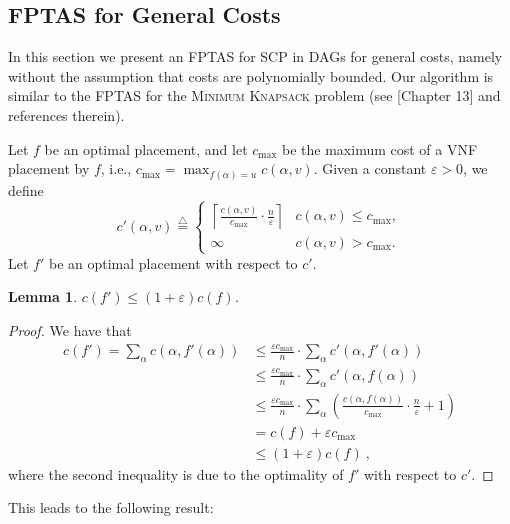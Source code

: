 \documentclass[11pt]{article}
\newtheorem{lemma}{Lemma}
\newcommand{\eqdf}{\stackrel{\scriptscriptstyle \triangle}{=}}
\newcommand{\paren}[1]{\left( #1 \right)}
\newcommand{\ceil}[1]{\left\lceil {#1} \right\rceil}
\newcommand{\eps}{\varepsilon}
\newcommand{\scp}{\textsc{SCP}\xspace}
\begin{document}

\subsection{FPTAS for General Costs}
\label{sub:fptas}

In this section we present an FPTAS for \scp in DAGs for general
costs, namely without the assumption that costs are polynomially
bounded.  Our algorithm is similar to the FPTAS for the
\textsc{Minimum Knapsack} problem (see \cite{KPP04}[Chapter 13] and
references therein).

Let $f$ be an optimal placement, and let $c_{\max}$ be the maximum
cost of a VNF placement by $f$, i.e., $c_{\max} = \max_{f(\alpha) =
  u} c(\alpha,v)$.
%
Given a constant $\eps>0$, we define
\[
c'(\alpha, v) \eqdf
\begin{cases}
\ceil{\frac{c(\alpha, v)}{c_{\max}} \cdot \frac{n}{\eps}}
       & c(\alpha, v) \leq c_{\max}, \\
\infty & c(\alpha, v) > c_{\max}.
\end{cases}
\]
Let $f'$ be an optimal placement with respect to $c'$.

\begin{lemma}
\label{lemma:guess}
$c(f') \leq (1+\eps)c(f)$.
\end{lemma}
\begin{proof}
We have that
\begin{align*}
c(f')
=    \sum_{\alpha} c(\alpha,f'(\alpha)) %
& \leq \frac{\eps c_{\max}}{n} \cdot \sum_{\alpha} c'(\alpha,f'(\alpha)) \\
& \leq \frac{\eps c_{\max}}{n} \cdot \sum_{\alpha} c'(\alpha,f(\alpha)) \\
& \leq \frac{\eps c_{\max}}{n} \cdot
     \sum_{\alpha}
       \paren{ \frac{c(\alpha,f(\alpha))}{c_{\max}} \cdot \frac{n}{\eps} + 1} \\
& =    c(f) + \eps c_{\max} \\
& \leq (1+\eps) c(f)
~,
\end{align*}
where the second inequality is due to the optimality of $f'$ with
respect to $c'$.
\end{proof}

This leads to the following result:
\end{document}
